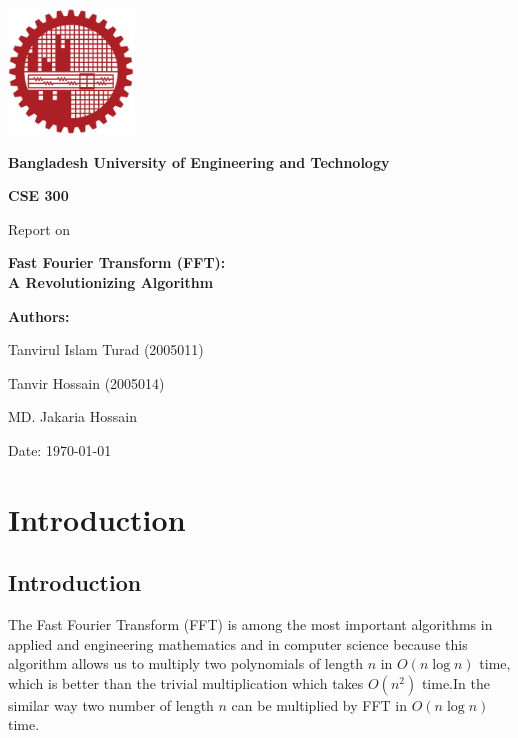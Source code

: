 \documentclass[28]{report}
\begin{document}
\begin{titlepage}
    \centering
    \vspace*{2cm}
    \includegraphics[width=0.25\textwidth]{images/buet.png}\\
    \vspace{1.5cm}
    {\Large \textbf{Bangladesh University of Engineering and Technology} \par}
    \vspace{2cm}
    {\LARGE \textbf{CSE 300} \par}
    \vspace{1cm}
    {\Large Report on \par}
    \vspace{0.5cm}
    {\LARGE \textbf{Fast Fourier Transform (FFT):\\[0.5em] A Revolutionizing Algorithm} \par}
    \vspace{1.5cm}
    {\large \textbf{Authors:} \par}
    \vspace{0.5cm}
    {\large Tanvirul Islam Turad (2005011) \par}
    {\large Tanvir Hossain (2005014) \par}
    {\large MD. Jakaria Hossain\par}
    \vspace{2cm}
    {\large Date: \today \par}
\end{titlepage}

\tableofcontents
\newpage

\chapter{Introduction}
\section{Introduction}
The Fast Fourier Transform (FFT) is among the most important algorithms
in applied and engineering mathematics and in computer science because this algorithm allows us to multiply two polynomials of length 
$n$ in 
$O(n \log n)$ time, which is better than the trivial multiplication which takes 
$O(n^2)$ time.In the similar way two number of length $n$ can be multiplied by FFT in $O(n \log n)$ time. \linebreak 
\end{document}
